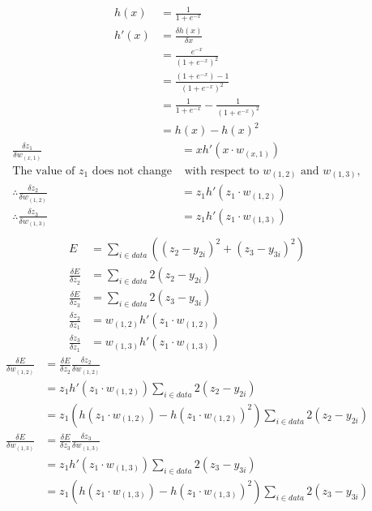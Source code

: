\documentclass[12pt]{article}
\newenvironment{solution}[2][Solution]{\begin{trivlist}
\item[\hskip \labelsep {\bfseries #1}]}{\end{trivlist}}
\begin{document}
\begin{solution}{}~
\begin{align*}
h(x)&=\frac{1}{1+e^{-x}}\\
h'(x)&=\frac{\delta h(x)}{\delta x}\\
&=\frac{e^{-x}}{(1+e^{-x})^2}\\
&=\frac{(1+e^{-x})-1}{(1+e^{-x})^2}\\
&=\frac{1}{1+e^{-x}}-\frac{1}{(1+e^{-x})^{2}}\\
&=h(x)-h(x)^2
\end{align*}
\begin{align*}
\frac{\delta z_1}{\delta w_{(x,1)}}&=xh'(x\cdot w_{(x,1)})\\
\text{The value of $z_1$ does not change}&\text{ with respect to }w_{(1,2)}\text{ and }w_{(1,3)},\\
\therefore\frac{\delta z_2}{\delta w_{(1,2)}}&=z_1h'(z_1\cdot w_{(1,2)})\\
\therefore\frac{\delta z_3}{\delta w_{(1,3)}}&=z_1h'(z_1\cdot w_{(1,3)})\\
\end{align*}
\begin{align*}
E &= \sum_{i\in data}((z_2-y_{2i})^2+(z_3-y_{3i})^2)\\
\frac{\delta E}{\delta z_2} &= \sum_{i\in data}2(z_2-y_{2i})\\
\frac{\delta E}{\delta z_3} &= \sum_{i\in data}2(z_3-y_{3i})\\
\frac{\delta z_2}{\delta z_1} &= w_{(1,2)}h'(z_1\cdot w_{(1,2)})\\
\frac{\delta z_3}{\delta z_1} &= w_{(1,3)}h'(z_1\cdot w_{(1,3)})
\end{align*}
\begin{align*}
\frac{\delta E}{\delta w_{(1,2)}} &= \frac{\delta E}{\delta z_2}\frac{\delta z_2}{\delta w_{(1,2)}}\\
&= z_1h'(z_1\cdot w_{(1,2)})\sum_{i\in data}2(z_2-y_{2i})\\
&= z_1(h(z_1\cdot w_{(1,2)})-h(z_1\cdot w_{(1,2)})^2)\sum_{i\in data}2(z_2-y_{2i})
\end{align*}
\begin{align*}
\frac{\delta E}{\delta w_{(1,3)}} &= \frac{\delta E}{\delta z_3}\frac{\delta z_3}{\delta w_{(1,3)}}\\
&= z_1h'(z_1\cdot w_{(1,3)})\sum_{i\in data}2(z_3-y_{3i})\\
&= z_1(h(z_1\cdot w_{(1,3)})-h(z_1\cdot w_{(1,3)})^2)\sum_{i\in data}2(z_3-y_{3i})
\end{align*}
\begin{align*}

\end{align*}
\end{solution}
\end{document}
